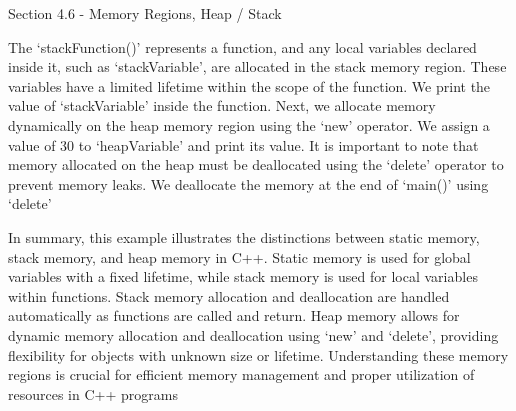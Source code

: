 \begin{notes}{Section 4.6 - Memory Regions, Heap / Stack}
\begin{highlight}
        The `stackFunction()' represents a function, and any local variables declared inside it, such as `stackVariable', are allocated in the stack memory region. These variables have a limited lifetime within the scope of the function. We print the value 
        of `stackVariable' inside the function. Next, we allocate memory dynamically on the heap memory region using the `new' operator. We assign a value of 30 to `heapVariable' and print its value. It is important to note that memory allocated on the heap 
        must be deallocated using the `delete' operator to prevent memory leaks. We deallocate the memory at the end of `main()' using `delete'
        
        In summary, this example illustrates the distinctions between static memory, stack memory, and heap memory in C++. Static memory is used for global variables with a fixed lifetime, while stack memory is used for local variables within functions. Stack 
        memory allocation and deallocation are handled automatically as functions are called and return. Heap memory allows for dynamic memory allocation and deallocation using `new' and `delete', providing flexibility for objects with unknown size or lifetime. 
        Understanding these memory regions is crucial for efficient memory management and proper utilization of resources in C++ programs
    \end{highlight}
\end{notes}

